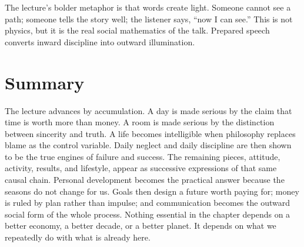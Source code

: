 The lecture's bolder metaphor is that words create light. Someone cannot see a path; someone tells the story well; the listener says, ``now I can see.'' This is not physics, but it is the real social mathematics of the talk. Prepared speech converts inward discipline into outward illumination.

\section{Summary}

The lecture advances by accumulation. A day is made serious by the claim that time is worth more than money. A room is made serious by the distinction between sincerity and truth. A life becomes intelligible when philosophy replaces blame as the control variable. Daily neglect and daily discipline are then shown to be the true engines of failure and success. The remaining pieces, attitude, activity, results, and lifestyle, appear as successive expressions of that same causal chain. Personal development becomes the practical answer because the seasons do not change for us. Goals then design a future worth paying for; money is ruled by plan rather than impulse; and communication becomes the outward social form of the whole process. Nothing essential in the chapter depends on a better economy, a better decade, or a better planet. It depends on what we repeatedly do with what is already here.